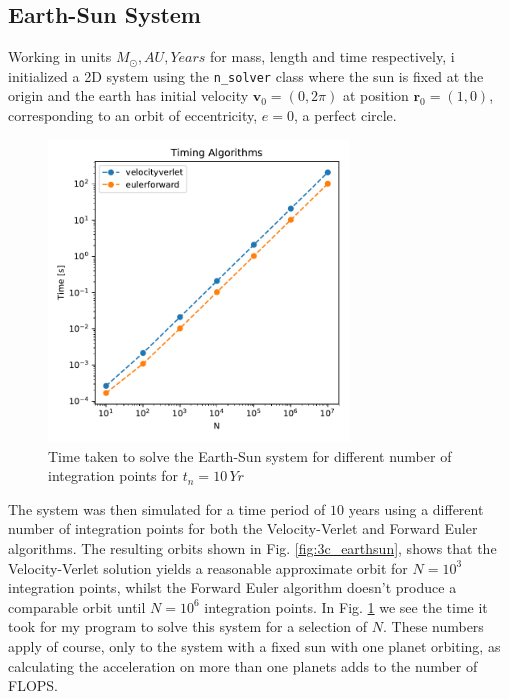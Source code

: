 \documentclass[10pt,showpacs,preprintnumbers,amsmath,amssymb,nofootinbib,aps,prl,twocolumn,groupedaddress,superscriptaddress,showkeys]{revtex4-1}
\begin{document}
  \subsection{Earth-Sun System}

    Working in units $M_\odot, AU, Years$ for mass, length and time respectively, i initialized a 2D system using the \lstinline{n_solver} class where the sun is fixed at the origin and the earth has initial velocity $\mathbf v_0 = (0, 2\pi)$ at position $\mathbf r_0 = (1, 0)$, corresponding to an orbit of eccentricity, $e=0$, a perfect circle.
    
    \begin{figure}[h!]
      \center
      \includegraphics[width=8cm]{figs/timing_earthsun.pdf}
      \caption{Time taken to solve the Earth-Sun system for different number of integration points for $t_n=10\, Yr$}
      \label{fig:timing}
    \end{figure}

    The system was then simulated for a time period of $10$ years using a different number of integration points for both the Velocity-Verlet and Forward Euler algorithms. The resulting orbits shown in Fig. \ref{fig:3c_earthsun}, shows that the Velocity-Verlet solution yields a reasonable approximate orbit for $N=10^3$ integration points, whilst the Forward Euler algorithm doesn't produce a comparable orbit until $N=10^6$ integration points. In Fig. \ref{fig:timing} we see the time it took for my program to solve this system for a selection of $N$. These numbers apply of course, only to the system with a fixed sun with one planet orbiting, as calculating the acceleration on more than one planets adds to the number of FLOPS.
\end{document}
